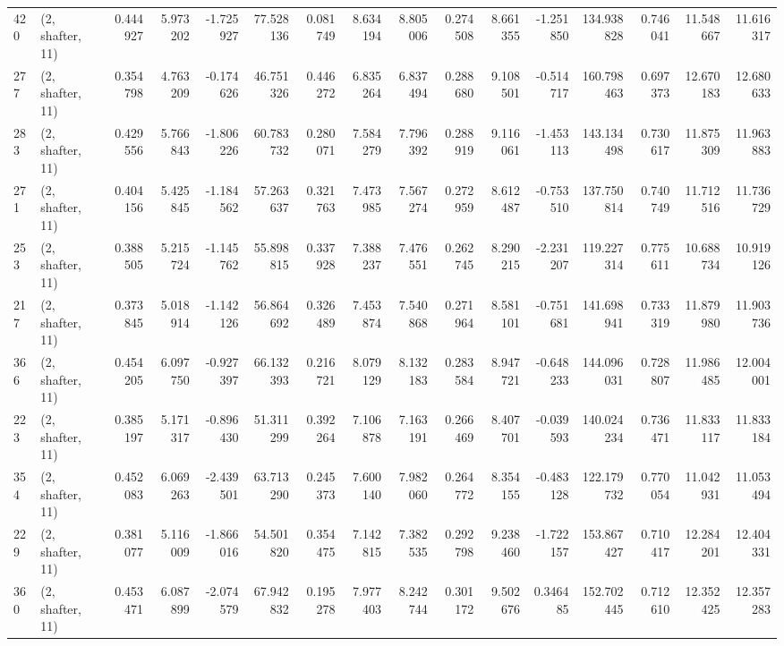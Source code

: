 \begin{tabular}{llrrrrrrrrrrrrrr}
420 &  (2, shafter, 11) &   0.444927 &   5.973202 &  -1.725927 &    77.528136 &   0.081749 &   8.634194 &   8.805006 &  0.274508 &   8.661355 &  -1.251850 &   134.938828 &   0.746041 &  11.548667 &  11.616317 \\
277 &  (2, shafter, 11) &   0.354798 &   4.763209 &  -0.174626 &    46.751326 &   0.446272 &   6.835264 &   6.837494 &  0.288680 &   9.108501 &  -0.514717 &   160.798463 &   0.697373 &  12.670183 &  12.680633 \\
283 &  (2, shafter, 11) &   0.429556 &   5.766843 &  -1.806226 &    60.783732 &   0.280071 &   7.584279 &   7.796392 &  0.288919 &   9.116061 &  -1.453113 &   143.134498 &   0.730617 &  11.875309 &  11.963883 \\
271 &  (2, shafter, 11) &   0.404156 &   5.425845 &  -1.184562 &    57.263637 &   0.321763 &   7.473985 &   7.567274 &  0.272959 &   8.612487 &  -0.753510 &   137.750814 &   0.740749 &  11.712516 &  11.736729 \\
253 &  (2, shafter, 11) &   0.388505 &   5.215724 &  -1.145762 &    55.898815 &   0.337928 &   7.388237 &   7.476551 &  0.262745 &   8.290215 &  -2.231207 &   119.227314 &   0.775611 &  10.688734 &  10.919126 \\
217 &  (2, shafter, 11) &   0.373845 &   5.018914 &  -1.142126 &    56.864692 &   0.326489 &   7.453874 &   7.540868 &  0.271964 &   8.581101 &  -0.751681 &   141.698941 &   0.733319 &  11.879980 &  11.903736 \\
366 &  (2, shafter, 11) &   0.454205 &   6.097750 &  -0.927397 &    66.132393 &   0.216721 &   8.079129 &   8.132183 &  0.283584 &   8.947721 &  -0.648233 &   144.096031 &   0.728807 &  11.986485 &  12.004001 \\
223 &  (2, shafter, 11) &   0.385197 &   5.171317 &  -0.896430 &    51.311299 &   0.392264 &   7.106878 &   7.163191 &  0.266469 &   8.407701 &  -0.039593 &   140.024234 &   0.736471 &  11.833117 &  11.833184 \\
354 &  (2, shafter, 11) &   0.452083 &   6.069263 &  -2.439501 &    63.713290 &   0.245373 &   7.600140 &   7.982060 &  0.264772 &   8.354155 &  -0.483128 &   122.179732 &   0.770054 &  11.042931 &  11.053494 \\
229 &  (2, shafter, 11) &   0.381077 &   5.116009 &  -1.866016 &    54.501820 &   0.354475 &   7.142815 &   7.382535 &  0.292798 &   9.238460 &  -1.722157 &   153.867427 &   0.710417 &  12.284201 &  12.404331 \\
360 &  (2, shafter, 11) &   0.453471 &   6.087899 &  -2.074579 &    67.942832 &   0.195278 &   7.977403 &   8.242744 &  0.301172 &   9.502676 &   0.346485 &   152.702445 &   0.712610 &  12.352425 &  12.357283 \\

\end{tabular}
